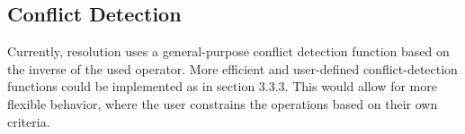 \subsection{Conflict Detection}
Currently, resolution uses a general-purpose conflict detection function based
on the inverse of the used operator. More efficient and user-defined
conflict-detection functions could be implemented as in section 3.3.3. This
would allow for more flexible behavior, where the user constrains the operations
based on their own criteria.


